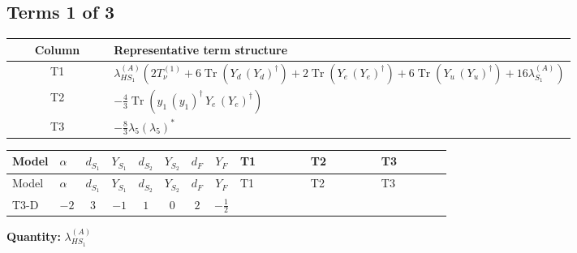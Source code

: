 \documentclass[8pt]{article}
\begin{document}
\begin{landscape}
\subsection*{Terms 1 of 3}
\begin{center}
\begin{tabular}{@{}c >{\raggedright\arraybackslash}p{0.82\linewidth}@{}}
\toprule
Column & Representative term structure \\
\midrule
T1 & \(\displaystyle {\lambda_{HS_1}^{(A)}} (2 T_{\nu}^{(1)}+6 \operatorname{Tr}\!\left({Y_d}\,\left({Y_d}\right)^{\dagger}\right)+2 \operatorname{Tr}\!\left({Y_e}\,\left({Y_e}\right)^{\dagger}\right)+6 \operatorname{Tr}\!\left({Y_u}\,\left({Y_u}\right)^{\dagger}\right)+16 {\lambda_{S_1}^{(A)}})\) \\
\midrule
T2 & \(\displaystyle -\frac{4}{3} \operatorname{Tr}\!\left({y_1}\,\left({y_1}\right)^{\dagger}\,{Y_e}\,\left({Y_e}\right)^{\dagger}\right)\) \\
\midrule
T3 & \(\displaystyle -\frac{8}{3} {\lambda_5} \left({\lambda_5}\right)^{*}\) \\
\midrule
\bottomrule
\end{tabular}
\end{center}
\smallskip
\tiny
\begin{longtable}{@{}llcccccc >{\raggedright\arraybackslash}p{0.21\linewidth} >{\raggedright\arraybackslash}p{0.21\linewidth} >{\raggedright\arraybackslash}p{0.21\linewidth}@{}}
\toprule
Model & $\alpha$ & $d_{S_1}$ & $Y_{S_1}$ & $d_{S_2}$ & $Y_{S_2}$ & $d_F$ & $Y_F$ & T1 & T2 & T3 \\
\midrule
\endfirsthead
\toprule
Model & $\alpha$ & $d_{S_1}$ & $Y_{S_1}$ & $d_{S_2}$ & $Y_{S_2}$ & $d_F$ & $Y_F$ & T1 & T2 & T3 \\
\midrule
\endhead
T3-D & $-2$ & $3$ & $-1$ & $1$ & $0$ & $2$ & $-\frac{1}{2}$ & \scriptsize\adjustbox{max width=\linewidth}{$\begin{gathered} {\lambda_{HS_1}^{(A)}} (2 T_{\nu}^{(1)}+6 \operatorname{Tr}\!\left({Y_d}\,\left({Y_d}\right)^{\dagger}\right)+2 \operatorname{Tr}\!\left({Y_e}\,\left({Y_e}\right)^{\dagger}\right)+6 \operatorname{Tr}\!\left({Y_u}\,\left({Y_u}\right)^{\dagger}\right)+16 {\lambda_{S_1}^{(A)}})\end{gathered}$} & \scriptsize\adjustbox{max width=\linewidth}{$\begin{gathered} -\frac{4}{3} \operatorname{Tr}\!\left({y_1}\,\left({y_1}\right)^{\dagger}\,{Y_e}\,\left({Y_e}\right)^{\dagger}\right)\end{gathered}$} & \scriptsize\adjustbox{max width=\linewidth}{$\begin{gathered} -\frac{8}{3} {\lambda_5} \left({\lambda_5}\right)^{*}\end{gathered}$} \\
\midrule
\bottomrule
\end{longtable}
\clearpage
\noindent\textbf{Quantity: }$\lambda_{HS_1}^{(A)}$\par\smallskip

\end{landscape}
\end{document}
